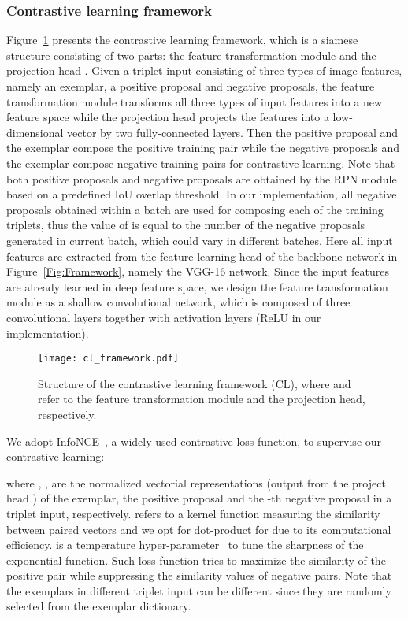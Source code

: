 \documentclass[journal]{IEEEtran}
\begin{document}
\subsubsection{Contrastive learning framework}
Figure~\ref{Fig:CL} presents the contrastive learning framework, which is a siamese structure consisting of two parts: the feature transformation module  and the projection head . 
Given a triplet input consisting of three types of image features, namely an exemplar, a positive proposal and  negative proposals, the feature transformation module  transforms all three types of input features into a new feature space while the projection head  projects the features into a low-dimensional vector by two fully-connected layers. Then the positive proposal and the exemplar compose the positive training pair while the negative proposals and the exemplar compose  negative training pairs for contrastive learning. Note that both positive proposals and negative proposals are obtained by the RPN module based on a predefined IoU overlap threshold. In our implementation, all negative proposals obtained within a batch are used for composing each of the training triplets, thus the value of  is equal to the number of the negative proposals generated in current batch, which could vary in different batches.
Here all input features are extracted from the feature learning head  of the backbone network in Figure~\ref{Fig:Framework}, namely the VGG-16 network. Since the input features are already learned in deep feature space, we design the feature transformation module  as a shallow convolutional network, which is composed of three convolutional layers together with activation layers (ReLU in our implementation). 

\begin{figure}[t]
\centering
    \texttt{[image: cl\_framework.pdf]}
    \vspace{-20pt}
    \caption{Structure of the contrastive learning framework (CL), where  and  refer to the feature transformation module and the projection head, respectively. }
    \vspace{-10pt}
\label{Fig:CL}
\end{figure}



We adopt InfoNCE~\cite{oord2018representation}, a widely used contrastive loss function, to supervise our contrastive learning:

where , ,  are the normalized vectorial representations (output from the project head ) of the exemplar, the positive proposal and the -th negative proposal in a triplet input, respectively. 
 refers to a kernel function measuring the similarity between paired vectors and we opt for dot-product for  due to its computational efficiency.  is a temperature hyper-parameter~\cite{wu2018unsupervised} to tune the sharpness of the exponential function.
Such loss function tries to maximize the similarity of the positive pair while suppressing the similarity values of  negative pairs. Note that the exemplars  in different triplet input can be different since they are randomly selected from the exemplar dictionary.
\end{document}
